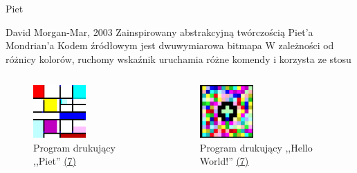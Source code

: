 \begin{frame}{Piet}

			\begin{itemize}
				\myitem David Morgan-Mar, 2003
				\myitem Zainspirowany abstrakcyjną twórczością Piet'a Mondrian'a
				\myitem Kodem źródłowym jest dwuwymiarowa bitmapa
                \myitem W zależności od różnicy kolorów, ruchomy wskaźnik uruchamia różne komendy i korzysta ze stosu
			\end{itemize}


    \begin{columns}
        \begin{column}{.5\hsize}
            \begin{figure}
                \includegraphics[height=2cm]{figures/piet_piet.png}
                \caption*{\scriptsize Program drukujący ,,Piet''{\color{blue} \hyperlink{frame:przypisy}{(7)}}}
            \end{figure}
        \end{column}
        \begin{column}{.5\hsize}
            \begin{figure}
                \includegraphics[height=2cm]{figures/piet_helloworld.png}
                \caption*{\scriptsize Program drukujący ,,Hello World!''{\color{blue} \hyperlink{frame:przypisy}{(7)}}}
            \end{figure}
        \end{column}
    \end{columns}


\end{frame}
